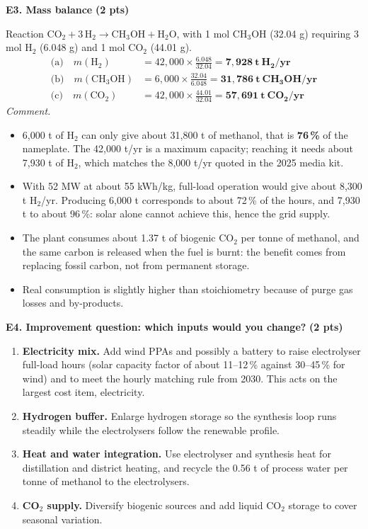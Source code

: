 \documentclass[11pt,a4paper]{article}
\newcommand{\pts}[1]{\hfill{\normalsize\textbf{(#1)}}}
\begin{document}
\textbf{E3. Mass balance} \pts{2 pts}

Reaction $\mathrm{CO_2 + 3\,H_2 \rightarrow CH_3OH + H_2O}$, with 1 mol CH$_3$OH (32.04 g) requiring 3 mol H$_2$
(6.048 g) and 1 mol CO$_2$ (44.01 g).
\begin{align*}
\text{(a)}\quad m(\mathrm{H_2}) &= 42{,}000 \times \frac{6.048}{32.04} = \mathbf{7{,}928\ t\ H_2/yr}\\
\text{(b)}\quad m(\mathrm{CH_3OH}) &= 6{,}000 \times \frac{32.04}{6.048} = \mathbf{31{,}786\ t\ CH_3OH/yr}\\
\text{(c)}\quad m(\mathrm{CO_2}) &= 42{,}000 \times \frac{44.01}{32.04} = \mathbf{57{,}691\ t\ CO_2/yr}
\end{align*}
\textit{Comment.}
\begin{itemize}
  \item 6,000 t of H$_2$ can only give about 31,800 t of methanol, that is \textbf{76\,\%} of the nameplate. The
        42,000 t/yr is a maximum capacity; reaching it needs about 7,930 t of H$_2$, which matches the 8,000 t/yr
        quoted in the 2025 media kit.
  \item With 52 MW at about 55 kWh/kg, full-load operation would give about 8,300 t H$_2$/yr. Producing 6,000 t
        corresponds to about 72\,\% of the hours, and 7,930 t to about 96\,\%: solar alone cannot achieve this,
        hence the grid supply.
  \item The plant consumes about 1.37 t of biogenic CO$_2$ per tonne of methanol, and the same carbon is released
        when the fuel is burnt: the benefit comes from replacing fossil carbon, not from permanent storage.
  \item Real consumption is slightly higher than stoichiometry because of purge gas losses and by-products.
\end{itemize}

\textbf{E4. Improvement question: which inputs would you change?} \pts{2 pts}

\begin{enumerate}
  \item \textbf{Electricity mix.} Add wind PPAs and possibly a battery to raise electrolyser full-load hours
        (solar capacity factor of about 11--12\,\% against 30--45\,\% for wind) and to meet the hourly matching rule
        from 2030. This acts on the largest cost item, electricity.
  \item \textbf{Hydrogen buffer.} Enlarge hydrogen storage so the synthesis loop runs steadily while the electrolysers
        follow the renewable profile.
  \item \textbf{Heat and water integration.} Use electrolyser and synthesis heat for distillation and district
        heating, and recycle the 0.56 t of process water per tonne of methanol to the electrolysers.
  \item \textbf{CO$_2$ supply.} Diversify biogenic sources and add liquid CO$_2$ storage to cover seasonal variation.
\end{enumerate}
\end{document}
